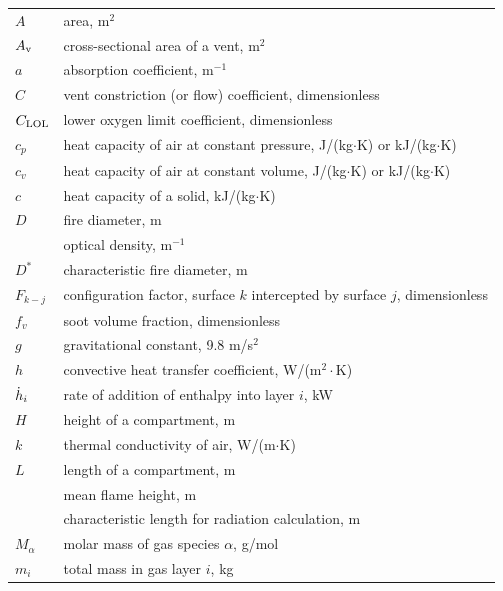 \documentclass[12pt]{book}
\begin{document}
\begin{center}
\begin{longtable}{p{1in}  p{5.5 in}}

$A$                 & area, m$^2$ \\
$A_{\rm v}$         & cross-sectional area of a vent, m$^2$ \\
$a$                 & absorption coefficient, m$^{-1}$ \\
$C$                 & vent constriction (or flow) coefficient, dimensionless \\
$C_{\rm LOL}$       & lower oxygen limit coefficient, dimensionless \\
$c_p$               & heat capacity of air at constant pressure, J/(kg$\cdot$K) or kJ/(kg$\cdot$K) \\
$c_v$               & heat capacity of air at constant volume, J/(kg$\cdot$K) or kJ/(kg$\cdot$K) \\
$c$                 & heat capacity of a solid, kJ/(kg$\cdot$K) \\
$D$                 & fire diameter, m \\
                    & optical density, m$^{-1}$ \\
$D^*$               & characteristic fire diameter, m \\
$F_{k-j}$           & configuration factor, surface $k$ intercepted by surface $j$, dimensionless \\
$f_v$               & soot volume fraction, dimensionless \\
$g$                 & gravitational constant, 9.8 m/s$^2$ \\
$h$                 & convective heat transfer coefficient, W/(m$^2\cdot$K) \\
$\dot{h}_i$            & rate of addition of enthalpy into layer $i$, kW \\
$H$                 & height of a compartment, m \\
$k$                 & thermal conductivity of air, W/(m$\cdot$K) \\
$L$                 & length of a compartment, m \\
                    & mean flame height, m \\
                    & characteristic length for radiation calculation, m \\
$M_\alpha$          & molar mass of gas species $\alpha$, g/mol \\
$m_i$               & total mass in gas layer $i$, kg \\

\end{longtable}
\end{center}
\end{document}
